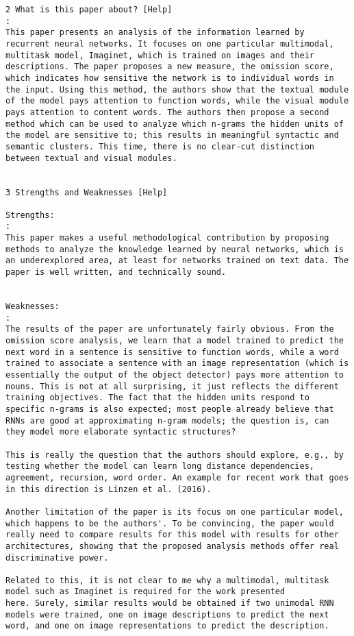 \begin{verbatim}
2 What is this paper about? [Help]
: 
This paper presents an analysis of the information learned by
recurrent neural networks. It focuses on one particular multimodal,
multitask model, Imaginet, which is trained on images and their
descriptions. The paper proposes a new measure, the omission score,
which indicates how sensitive the network is to individual words in
the input. Using this method, the authors show that the textual module
of the model pays attention to function words, while the visual module
pays attention to content words. The authors then propose a second
method which can be used to analyze which n-grams the hidden units of
the model are sensitive to; this results in meaningful syntactic and
semantic clusters. This time, there is no clear-cut distinction
between textual and visual modules.


3 Strengths and Weaknesses [Help]

Strengths:
: 
This paper makes a useful methodological contribution by proposing
methods to analyze the knowledge learned by neural networks, which is
an underexplored area, at least for networks trained on text data. The
paper is well written, and technically sound.


Weaknesses:
: 
The results of the paper are unfortunately fairly obvious. From the
omission score analysis, we learn that a model trained to predict the
next word in a sentence is sensitive to function words, while a word
trained to associate a sentence with an image representation (which is
essentially the output of the object detector) pays more attention to
nouns. This is not at all surprising, it just reflects the different
training objectives. The fact that the hidden units respond to
specific n-grams is also expected; most people already believe that
RNNs are good at approximating n-gram models; the question is, can
they model more elaborate syntactic structures?

This is really the question that the authors should explore, e.g., by
testing whether the model can learn long distance dependencies,
agreement, recursion, word order. An example for recent work that goes
in this direction is Linzen et al. (2016).

Another limitation of the paper is its focus on one particular model,
which happens to be the authors'. To be convincing, the paper would
really need to compare results for this model with results for other
architectures, showing that the proposed analysis methods offer real
discriminative power.

Related to this, it is not clear to me why a multimodal, multitask
model such as Imaginet is required for the work presented
here. Surely, similar results would be obtained if two unimodal RNN
models were trained, one on image descriptions to predict the next
word, and one on image representations to predict the description.



\end{verbatim}
